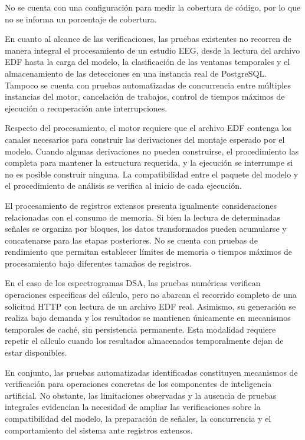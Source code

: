 No se cuenta con una configuración para medir la cobertura de código, por lo que no se informa un porcentaje de cobertura.

En cuanto al alcance de las verificaciones, las pruebas
existentes no recorren de manera integral el procesamiento
de un estudio EEG, desde la lectura del archivo EDF hasta
la carga del modelo, la clasificación de las ventanas
temporales y el almacenamiento de las detecciones en una
instancia real de PostgreSQL. Tampoco se cuenta con
pruebas automatizadas de concurrencia entre múltiples
instancias del motor, cancelación de trabajos, control de
tiempos máximos de ejecución o recuperación ante
interrupciones.

Respecto del procesamiento, el motor requiere que el archivo
EDF contenga los canales necesarios para construir las
derivaciones del montaje esperado por el modelo. Cuando
algunas derivaciones no pueden construirse, el procedimiento
las completa para mantener la estructura requerida, y la
ejecución se interrumpe si no es posible construir ninguna.
La compatibilidad entre el paquete del modelo y el
procedimiento de análisis se verifica al inicio de cada
ejecución.

El procesamiento de registros extensos presenta
igualmente consideraciones relacionadas con el consumo
de memoria. Si bien la lectura de determinadas señales
se organiza por bloques, los datos transformados pueden
acumularse y concatenarse para las etapas posteriores.
No se cuenta con pruebas de rendimiento que permitan
establecer límites de memoria o tiempos máximos de
procesamiento bajo diferentes tamaños de registros.

En el caso de los espectrogramas DSA, las pruebas
numéricas verifican operaciones específicas del cálculo,
pero no abarcan el recorrido completo de una solicitud
HTTP con lectura de un archivo EDF real. Asimismo,
su generación se realiza bajo demanda y los resultados
se mantienen únicamente en mecanismos temporales de
caché, sin persistencia permanente. Esta modalidad
requiere repetir el cálculo cuando los resultados
almacenados temporalmente dejan de estar disponibles.

En conjunto, las pruebas automatizadas identificadas
constituyen mecanismos de verificación para operaciones
concretas de los componentes de inteligencia artificial.
No obstante, las limitaciones observadas y la ausencia
de pruebas integrales evidencian la necesidad de ampliar
las verificaciones sobre la compatibilidad del modelo,
la preparación de señales, la concurrencia y el
comportamiento del sistema ante registros extensos.

